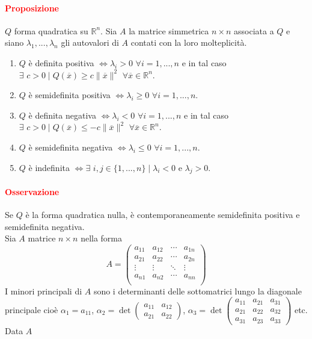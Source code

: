 \documentclass{article}
\newcommand{\R}{\mathbb{R}}
\begin{document}
\paragraph{\textcolor{red}{Proposizione}}
$Q$ forma quadratica su $\R^n$. Sia $A$ la matrice simmetrica $n \times n$ associata a $Q$ e siano $\lambda_1,...,\lambda_n$ gli autovalori di $A$ contati con la loro molteplicità.
\begin{enumerate}
    \item $Q$ è definita positiva $\Leftrightarrow \lambda_i >0 \,\, \forall i =1,...,n$ e in tal caso $\exists \,\, c >0 \mid Q(\overline{x})\geq c\|\overline{x}\|^2\,\, \forall \overline{x} \in \R^n$.
    \item $Q$ è semidefinita positiva $\Leftrightarrow \lambda_i \geq 0 \,\, \forall i=1,...,n$.
    \item $Q$ è definita negativa $\Leftrightarrow \lambda_i <0 \,\, \forall i =1,...,n$ e in tal caso $\exists \,\, c >0 \mid Q(\overline{x})\leq -c\|\overline{x}\|^2\,\, \forall \overline{x} \in \R^n$.
    \item $Q$ è semidefinita negativa $\Leftrightarrow \lambda_i \leq 0 \,\, \forall i=1,...,n$.
    \item $Q$ è indefinita $\Leftrightarrow \exists\,\, i,j \in \{1,...,n\} \mid \lambda_i <0$ e $\lambda_j>0$.
\end{enumerate}
\paragraph{\textcolor{red}{Osservazione}}
Se $Q$ è la forma quadratica nulla, è contemporaneamente semidefinita positiva e semidefinita negativa.\\
Sia $A$ matrice $n \times n$ nella forma
\begin{equation*}
    A= \begin{pmatrix}
    a_{11}&a_{12} &\cdots &a_{1n} \\
    a_{21}&a_{22} &\cdots &a_{2n} \\
    \vdots&\vdots &\ddots &\vdots \\
    a_{n1}&a_{n2} &\cdots &a_{nn} \\
\end{pmatrix}
\end{equation*}
I minori principali di $A$ sono i determinanti delle sottomatrici lungo la diagonale principale cioè $\alpha_1=a_{11}$, $\alpha_2=\det\begin{pmatrix}
    a_{11}&a_{12} \\
    a_{21}&a_{22}
\end{pmatrix}$, $\alpha_3=\det\begin{pmatrix}
    a_{11}&a_{21}&a_{31} \\
    a_{21}&a_{22}&a_{32} \\
    a_{31}&a_{23}&a_{33} 
\end{pmatrix}$
etc.\\
Data $A$
\end{document}
